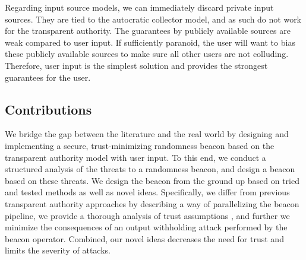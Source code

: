 Regarding input source models, we can immediately discard private input sources. They are tied to the autocratic collector model, and as such do not work for the transparent authority. The guarantees by publicly available sources are weak compared to user input. If sufficiently paranoid, the user will want to bias these publicly available sources to make sure all other users are not colluding. Therefore, user input is the simplest solution and provides the strongest guarantees for the user.

\subsection{Contributions}
We bridge the gap between the literature and the real world by designing and implementing a secure, trust-minimizing randomness beacon based on the transparent authority model with user input. To this end, we conduct a structured analysis of the threats to a randomness beacon, and design a beacon based on these threats. We design the beacon from the ground up based on tried and tested methods as well as novel ideas. Specifically, we differ from previous transparent authority approaches by describing a way of parallelizing the beacon pipeline, we provide a thorough analysis of trust assumptions , and further we minimize the consequences of an output withholding attack performed by the beacon operator. Combined, our novel ideas decreases the need for trust and limits the severity of attacks.
